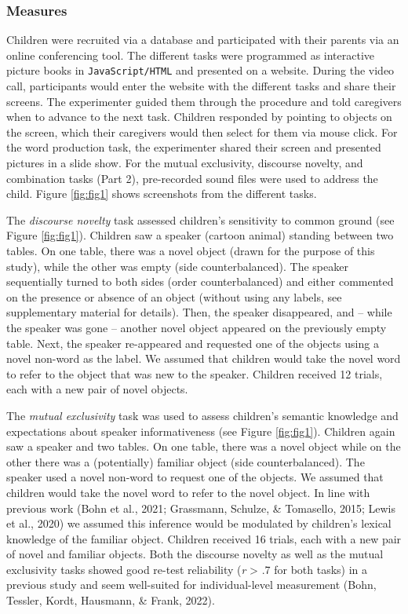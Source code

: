 \documentclass[
  man,floatsintext]{apa6}
\begin{document}
\hypertarget{measures}{%
\subsubsection{Measures}\label{measures}}

Children were recruited via a database and participated with their parents via an online conferencing tool. The different tasks were programmed as interactive picture books in \texttt{JavaScript/HTML} and presented on a website. During the video call, participants would enter the website with the different tasks and share their screens. The experimenter guided them through the procedure and told caregivers when to advance to the next task. Children responded by pointing to objects on the screen, which their caregivers would then select for them via mouse click. For the word production task, the experimenter shared their screen and presented pictures in a slide show. For the mutual exclusivity, discourse novelty, and combination tasks (Part 2), pre-recorded sound files were used to address the child. Figure \ref{fig:fig1} shows screenshots from the different tasks.

The \emph{discourse novelty} task assessed children's sensitivity to common ground (see Figure \ref{fig:fig1}). Children saw a speaker (cartoon animal) standing between two tables. On one table, there was a novel object (drawn for the purpose of this study), while the other was empty (side counterbalanced). The speaker sequentially turned to both sides (order counterbalanced) and either commented on the presence or absence of an object (without using any labels, see supplementary material for details). Then, the speaker disappeared, and -- while the speaker was gone -- another novel object appeared on the previously empty table. Next, the speaker re-appeared and requested one of the objects using a novel non-word as the label. We assumed that children would take the novel word to refer to the object that was new to the speaker. Children received 12 trials, each with a new pair of novel objects.

The \emph{mutual exclusivity} task was used to assess children's semantic knowledge and expectations about speaker informativeness (see Figure \ref{fig:fig1}). Children again saw a speaker and two tables. On one table, there was a novel object while on the other there was a (potentially) familiar object (side counterbalanced). The speaker used a novel non-word to request one of the objects. We assumed that children would take the novel word to refer to the novel object. In line with previous work (Bohn et al., 2021; Grassmann, Schulze, \& Tomasello, 2015; Lewis et al., 2020) we assumed this inference would be modulated by children's lexical knowledge of the familiar object. Children received 16 trials, each with a new pair of novel and familiar objects. Both the discourse novelty as well as the mutual exclusivity tasks showed good re-test reliability (\emph{r} \textgreater{} .7 for both tasks) in a previous study and seem well-suited for individual-level measurement (Bohn, Tessler, Kordt, Hausmann, \& Frank, 2022).
\end{document}

